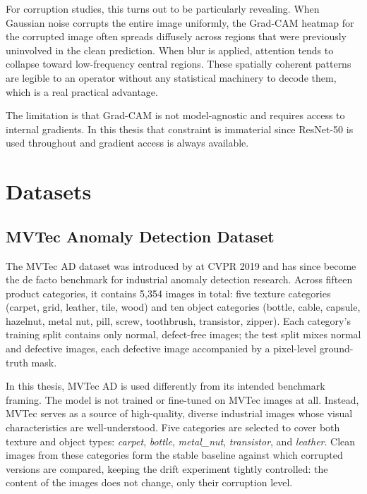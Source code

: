 For corruption studies, this turns out to be particularly revealing. When Gaussian noise corrupts the entire image uniformly, the Grad-CAM heatmap for the corrupted image often spreads diffusely across regions that were previously uninvolved in the clean prediction. When blur is applied, attention tends to collapse toward low-frequency central regions. These spatially coherent patterns are legible to an operator without any statistical machinery to decode them, which is a real practical advantage.

The limitation is that Grad-CAM is not model-agnostic and requires access to internal gradients. In this thesis that constraint is immaterial since ResNet-50 is used throughout and gradient access is always available.

\section{Datasets}
\label{sec:datasets}

\subsection{MVTec Anomaly Detection Dataset}

The MVTec AD dataset was introduced by \textcite{Bergmann2019} at CVPR 2019 and has since become the de facto benchmark for industrial anomaly detection research. Across fifteen product categories, it contains 5,354 images in total: five texture categories (carpet, grid, leather, tile, wood) and ten object categories (bottle, cable, capsule, hazelnut, metal nut, pill, screw, toothbrush, transistor, zipper). Each category's training split contains only normal, defect-free images; the test split mixes normal and defective images, each defective image accompanied by a pixel-level ground-truth mask.

In this thesis, MVTec AD is used differently from its intended benchmark framing. The model is not trained or fine-tuned on MVTec images at all. Instead, MVTec serves as a source of high-quality, diverse industrial images whose visual characteristics are well-understood. Five categories are selected to cover both texture and object types: \textit{carpet}, \textit{bottle}, \textit{metal\_nut}, \textit{transistor}, and \textit{leather}. Clean images from these categories form the stable baseline against which corrupted versions are compared, keeping the drift experiment tightly controlled: the content of the images does not change, only their corruption level.

